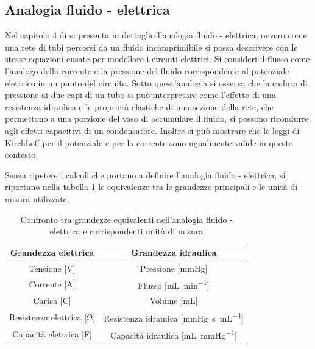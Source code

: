 \documentclass{article}
\begin{document}
\subsection{Analogia fluido - elettrica}
Nel capitolo 4 di \cite{notes} si presenta in dettaglio l'analogia fluido - elettrica, ovvero come una rete di tubi percorsi da un fluido incomprimibile si possa descrivere con le stesse equazioni cusate per modellare i circuiti elettrici.
Si consideri il flusso come l'analogo della corrente e la pressione del fluido corrispondente al potenziale elettrico in un punto del circuito.
Sotto quest'analogia si osserva che la caduta di pressione ai due capi di un tubo si può interpretare come l'effetto di una resistenza idraulica e le proprietà elastiche di una sezione della rete, che permettono a una porzione del vaso di accumulare il fluido, si possono ricondurre agli effetti capacitivi di un condensatore.
Inoltre si può mostrare che le leggi di Kirchhoff per il potenziale e per la corrente sono ugualmente valide in questo contesto.

Senza ripetere i calcoli che portano a definire l'analogia fluido - elettrica, si riportano nella tabella \ref{tab_analogia} le equivalenze tra le grandezze principali e le unità di misura utilizzate.

\begin{table}[h!]
\begin{center}
\begin{tabular}{| c | c |}
\hline
\textbf{Grandezza elettrica} & \textbf{Grandezza idraulica}\\
\hline
Tensione [\si{\volt}] & Pressione [\si{\mmHg}]\\
Corrente [\si{\ampere}] & Flusso [\si{\milli\liter \per \minute}]\\
Carica [\si{\coulomb}] & Volume [\si{\milli\liter}]\\
Resistenza elettrica [\si{\ohm}] & Resistenza idraulica [\si{\mmHg \second \per \milli\liter}]\\
Capacità elettrica [\si{\farad}] & Capacità idraulica [\si{\milli\liter \per \mmHg}]\\
\hline
\end{tabular}
\caption{Confronto tra grandezze equivalenti nell'analogia fluido - elettrica e corrispondenti unità di misura}
\label{tab_analogia}
\end{center}
\end{table}
\end{document}
